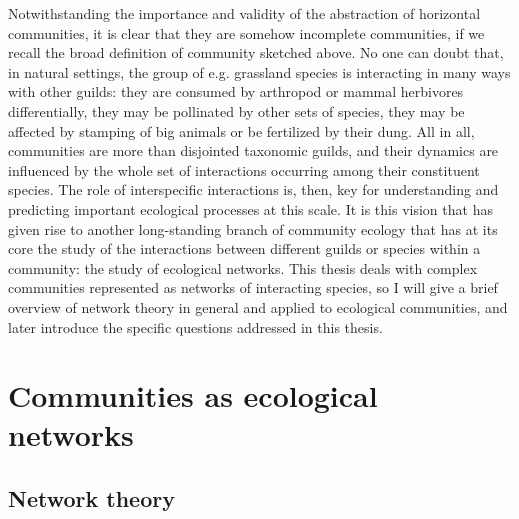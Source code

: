 Notwithstanding the importance and validity of the abstraction of horizontal communities, it is clear that they are somehow incomplete communities, if we recall the broad definition of community sketched above. No one can doubt that, in natural settings, the group of e.g. grassland species is interacting in many ways with other guilds: they are consumed by arthropod or mammal herbivores differentially, they may be pollinated by other sets of species, they may be affected by stamping of big animals or be fertilized by their dung. All in all, communities are more than disjointed taxonomic guilds, and their dynamics are influenced by the whole set of interactions occurring among their constituent species. The role of interspecific interactions is, then, key for understanding and predicting important ecological processes at this scale. It is this vision that has given rise to another long-standing branch of community ecology that has at its core the study of the interactions between different guilds or species within a community: the study of ecological networks. This thesis deals with complex communities represented as networks of interacting species, so I will give a brief overview of network theory in general and applied to ecological communities, and later introduce the specific questions addressed in this thesis.

\section{Communities as ecological networks}
\subsection{Network theory}

